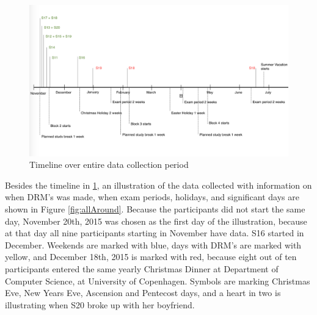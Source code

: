 \documentclass[12pt]{article} %
\begin{document}
\begin{figure}[H]
    \centering
        \includegraphics[width=\textwidth]{img/timeline}
        \caption{Timeline over entire data collection period}
        \label{fig:timeline}
\end{figure}

Besides the timeline in \ref{fig:timeline}, an illustration of the data collected with information on when DRM's was made, when exam periods, holidays, and significant days are shown in Figure \ref{fig:allAround}. Because the participants did not start the same day, November 20th, 2015 was chosen as the first day of the illustration, because at that day all nine participants starting in November have data. S16 started in December. Weekends are marked with blue, days with DRM's are marked with yellow, and December 18th, 2015 is marked with red, because eight out of ten participants entered the same yearly Christmas Dinner at Department of Computer Science, at University of Copenhagen. Symbols are marking Christmas Eve, New Years Eve, Ascension and Pentecost days, and a heart in two is illustrating when S20 broke up with her boyfriend. 
\end{document}

